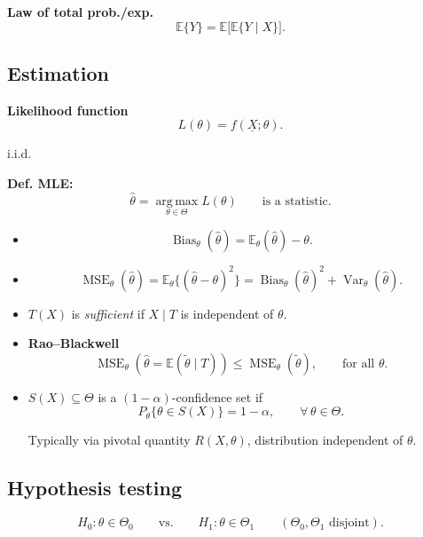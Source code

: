 \documentclass[11pt,a4paper]{article}
\begin{document}
\noindent\textbf{Law of total prob./exp.}
\[
\mathbb{E}\{Y\}
=
\mathbb{E}\bigl[\mathbb{E}\{Y\mid X\}\bigr].
\]

\subsection*{Estimation}

\noindent\textbf{Likelihood function}
\[
L(\theta)=f(\underline{X};\theta).
\]

\noindent
i.i.d.

\medskip

\noindent\textbf{Def. MLE:}
\[
\hat{\theta}
=
\operatorname*{arg\,max}_{\theta\in\Theta}L(\theta)
\qquad
\text{is a statistic}.
\]

\begin{itemize}
    \item
    \[
    \operatorname{Bias}_{\theta}(\hat{\theta})
    =
    \mathbb{E}_{\theta}(\hat{\theta})-\theta.
    \]

    \item
    \[
    \operatorname{MSE}_{\theta}(\hat{\theta})
    =
    \mathbb{E}_{\theta}\bigl\{(\hat{\theta}-\theta)^2\bigr\}
    =
    \operatorname{Bias}_{\theta}(\hat{\theta})^2
    +
    \operatorname{Var}_{\theta}(\hat{\theta}).
    \]

    \item
    $T(X)$ is \emph{sufficient} if $X\mid T$ is independent of
    $\theta$.

    \item
    \textbf{Rao--Blackwell}
    \[
    \operatorname{MSE}_{\theta}
    \left(
        \hat{\theta}=\mathbb{E}(\tilde{\theta}\mid T)
    \right)
    \leq
    \operatorname{MSE}_{\theta}(\tilde{\theta}),
    \qquad
    \text{for all }\theta.
    \]

    \item
    $S(X)\subseteq\Theta$ is a $(1-\alpha)$-confidence set if
    \[
    P_{\theta}\{\theta\in S(X)\}
    =
    1-\alpha,
    \qquad
    \forall\,\theta\in\Theta.
    \]

    Typically via pivotal quantity $R(X,\theta)$,
    distribution independent of $\theta$.
\end{itemize}

\subsection*{Hypothesis testing}

\[
H_0:\theta\in\Theta_0
\qquad\text{vs.}\qquad
H_1:\theta\in\Theta_1
\qquad
(\Theta_0,\Theta_1\text{ disjoint}).
\]
\end{document}
